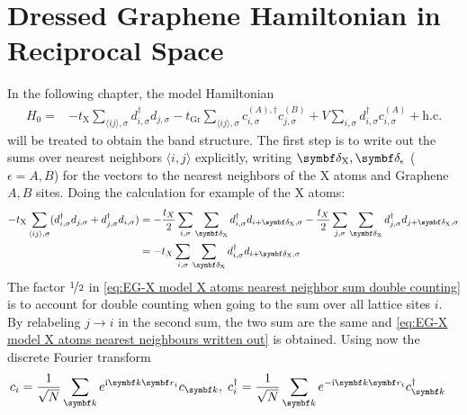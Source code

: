 \documentclass[../main.tex]{subfiles}
\begin{document}
	\chapter{Dressed Graphene Hamiltonian in Reciprocal Space}
	
	
	In the following chapter, the model Hamiltonian
	\begin{align}
		H_0 = &-t_{\mathrm{X}} \sum_{\langle ij \rangle, \sigma} d_{i, \sigma}^{\dagger} d_{j, \sigma}
		-t_{\mathrm{Gr}} \sum_{\langle ij \rangle, \sigma}
		c_{i, \sigma}^{(A), \dagger} c_{j, \sigma}^{(B)}
		+ V \sum_{i, \sigma} d_{i, \sigma}^{\dagger} c_{i, \sigma}^{(A)} + \mathrm{h.c.} \label{eq:EG-X model Hamiltonian non-interacting appendix}
	\end{align}
	will be treated to obtain the band structure. The first step is to write out the sums over nearest neighbors \(\langle i, j \rangle\) explicitly, writing \(\vb{\delta}_{\mathrm{X}}, \vb{\delta}_{\epsilon}\) (\(\epsilon = A, B\)) for the vectors to the nearest neighbors of the \(\mathrm{X}\) atoms and Graphene \(A, B\) sites.
	Doing the calculation for example of the \(\mathrm{X}\) atoms:
	\begin{align}
		-t_{\mathrm{X}} \sum_{\langle ij \rangle, \sigma} (d_{i, \sigma}^{\dagger} d_{j, \sigma} + d_{j, \sigma}^{\dagger} d_{i, \sigma})
		&= -\frac{t_X}{2} \sum_{i,\sigma} \sum_{\vb{\delta}_{\mathrm{X}}} d_{i, \sigma}^{\dagger} d_{i + \vb{\delta}_{\mathrm{X}}, \sigma}
		-\frac{t_X}{2} \sum_{j,\sigma} \sum_{\vb{\delta}_{\mathrm{X}}} d_{j, \sigma}^{\dagger} d_{j + \vb{\delta}_{\mathrm{X}}, \sigma} \label{eq:EG-X model X atoms nearest neighbor sum double counting} \\
		&= -t_X \sum_{i,\sigma} \sum_{\vb{\delta}_{\mathrm{X}}} d_{i, \sigma}^{\dagger} d_{i + \vb{\delta}_{\mathrm{X}}, \sigma} \label{eq:EG-X model X atoms nearest neighbours written out}
	\end{align}
	The factor \(\nicefrac{1}{2}\) in \cref{eq:EG-X model X atoms nearest neighbor sum double counting} is to account for double counting when going to the sum over all lattice sites \(i\).
	By relabeling \(j \to i\) in the second sum, the two sum are the same and \cref{eq:EG-X model X atoms nearest neighbours written out} is obtained.
	Using now the discrete Fourier transform
	\begin{align}
		c_{i} &= \frac{1}{\sqrt{N}} \sum_{\vb{k}} e^{\iu \vb{k} \vb{r}_{i}} c_{\vb{k}} ,\;
		c_{i}^{\dagger} = \frac{1}{\sqrt{N}} \sum_{\vb{k}} e^{-\iu \vb{k} \vb{r}_{i}} c_{\vb{k}}^{\dagger}
	\end{align}
\end{document}
